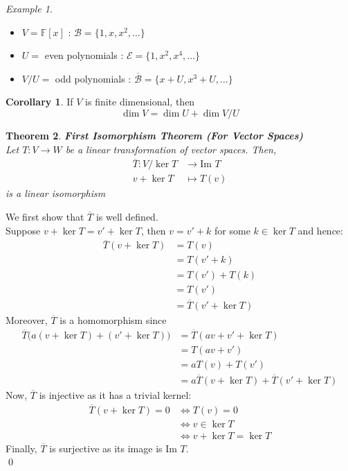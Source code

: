 \documentclass[11pt, a4paper]{report}
\makeatletter
\numberwithin{equation}{section}
\newcommand{\F}{\mathbb{F}}
\newcommand{\im}{\text{Im }}
\numberwithin{equation}{subsection}
\theoremstyle{plain}
\newtheorem{thm}{Theorem}[chapter] %
\theoremstyle{definition}
\newtheorem{cor}[thm]{Corollary}
\theoremstyle{remark}
\newtheorem{exmp}{Example}[chapter]
\newtheorem*{prf}{Proof}
\renewenvironment{prf}[1][\proofname]{\par
  \vspace{-\topsep}%
  \normalfont
  \topsep0pt \partopsep0pt %
  \trivlist
  \item[\hskip\labelsep
        \itshape
    #1\@addpunct{.}]\ignorespaces
}{%
  \popQED\endtrivlist\@endpefalse
  \addvspace{6pt plus 6pt} %
}
\newcommand{\pr}[1]{\begin{adjustwidth}{1cm}{} \begin{prf} #1 \end{prf} \end{adjustwidth}}
\makeatother
\begin{document}
\begin{exmp}${}$
\begin{itemize}
\item[] $V = \F[x]$ : $\mathcal{B} = \{1, x, x^2, \ldots\}$
\item[] $U =$ even polynomials : $\mathcal{E} = \{1, x^2, x^4, \ldots\}$
\item[] $V/U =$ odd polynomials : $\overline{\mathcal{B}} = \{x + U, x^3 + U, \ldots \}$\\
\end{itemize}
\end{exmp}

\begin{cor} If $V$ is finite dimensional, then $$\dim V = \dim U + \dim V/U$$ \end{cor}

\newpage

\begin{thm} \textnormal{\textbf{First Isomorphism Theorem (For Vector Spaces)}}\\
Let $T: V \to W$ be a linear transformation of vector spaces. Then,
\begin{align*}
\overline{T} : V/\ker T &\to \im T\\
				v + \ker T &\mapsto T(v)
\end{align*}
is a linear isomorphism
\end{thm}
\pr{
We first show that $\overline{T}$ is well defined.\\ Suppose $v + \ker T = v' + \ker T$, then $v = v' + k$ for some $k \in \ker T$ and hence:
\begin{align*}
\overline{T}(v + \ker T) 	&= T(v)\\
							&= T(v' + k)\\
							&= T(v') + T(k)\\
							&= T(v')\\
							&= \overline{T}(v' + \ker T)
\end{align*}
Moreover, $\overline{T}$ is a homomorphism since
\begin{align*}
\overline{T}\big(a(v + \ker T) + (v' + \ker T)\big) 	&= \overline{T}(av + v' + \ker T)\\
														&= T(av + v')\\
														&= aT(v) + T(v')\\
														&= a \overline{T}(v + \ker T) + \overline{T}(v' + \ker T)
\end{align*}
Now, $\overline{T}$ is injective as it has a trivial kernel:
\begin{align*}
\overline{T}(v + \ker T) = 0 	&\iff T(v) = 0\\
								&\iff v \in \ker T\\
								&\iff v + \ker T = \ker T \tag{Since $\ker T$ is a vector subspace}
\end{align*}
Finally, $\overline{T}$ is surjective as its image is $\im T$. \\[-8pt]\qed
}
\end{document}
